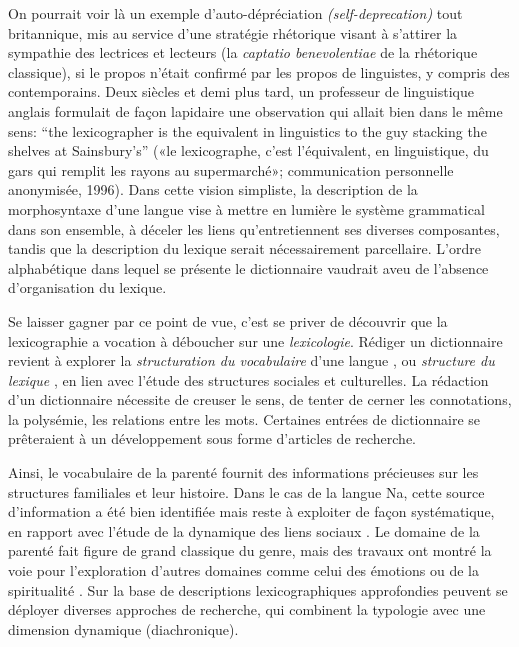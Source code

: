 On pourrait voir là un exemple d'auto-dépréciation \emph{(self-deprecation)} tout britannique, mis au service d'une stratégie rhétorique visant à s'attirer la sympathie des lectrices et lecteurs (la \emph{captatio benevolentiae} de la rhétorique classique), si le propos n'était confirmé par les propos de linguistes, y compris des contemporains. Deux siècles et demi plus tard, un professeur de linguistique anglais formulait de façon lapidaire une observation qui allait bien dans le même sens: “the lexicographer is the equivalent in linguistics to the guy stacking the shelves at Sainsbury’s” («le lexicographe, c'est l'équivalent, en linguistique, du gars qui remplit les rayons au supermarché»; communication personnelle anonymisée, 1996). %
Dans cette vision simpliste, la description de la morphosyntaxe d’une langue vise à mettre en lumière le système grammatical dans son ensemble, à déceler les liens qu’entretiennent ses diverses composantes, tandis que la description du lexique serait nécessairement parcellaire. L’ordre alphabétique dans lequel se présente le dictionnaire vaudrait aveu de l’absence d’organisation du lexique.

Se laisser gagner par ce point de vue, c'est se priver de découvrir que la lexicographie a vocation à déboucher sur une \emph{lexicologie}. Rédiger un dictionnaire revient à explorer la \emph{structuration du vocabulaire} d'une langue \parencite[384]{thomas_noms_1989}, ou \emph{structure du lexique} \parencite{francois2008semantic}, en lien avec l'étude des structures sociales et culturelles. La rédaction d'un dictionnaire nécessite de creuser le sens, de tenter de cerner les connotations, la polysémie, les relations entre les mots. Certaines entrées de dictionnaire se prêteraient à un développement sous forme d'articles de recherche.

Ainsi, le vocabulaire de la parenté fournit des informations précieuses sur les structures familiales et leur histoire. Dans le cas de la langue Na, cette source d’information a été bien identifiée \parencite{fu1983} mais reste à exploiter de façon systématique, en rapport avec l'étude de la dynamique des liens sociaux \parencite{milan2021entraide}. Le domaine de la parenté fait figure de grand classique du genre, mais des travaux ont montré la voie pour l’exploration d’autres domaines comme celui des émotions \parencite{tersis_langage_2017} ou de la spiritualité \parencite{francois_shadows_2013}. Sur la base de descriptions lexicographiques approfondies peuvent se déployer diverses approches de recherche, qui combinent la typologie avec une dimension dynamique (diachronique).

